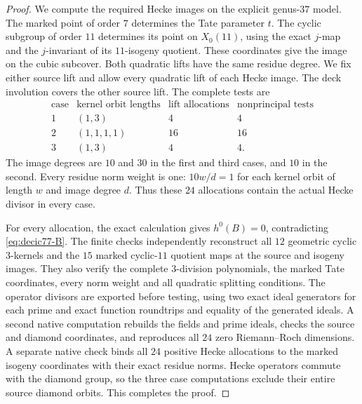 \begin{proof}
We compute the required Hecke images on the explicit genus-$37$
model.
The marked point of order $7$ determines the Tate parameter $t$.
The cyclic subgroup of order $11$ determines its point on
$X_0(11)$, using the exact $j$-map and the $j$-invariant of its
$11$-isogeny quotient.
These coordinates give the image on the cubic subcover.
Both quadratic lifts have the same residue degree.
We fix either source lift and allow every quadratic lift of each
Hecke image. The deck involution covers the other source lift.
The complete tests are
\[
\begin{array}{c|c|c|c}
\text{case}&\text{kernel orbit lengths}&\text{lift allocations}
 &\text{nonprincipal tests}\\\hline
1&(1,3)&4&4\\
2&(1,1,1,1)&16&16\\
3&(1,3)&4&4.
\end{array}
\]
The image degrees are $10$ and $30$ in the first and third
cases, and $10$ in the second.
Every residue norm weight is one: $10w/d=1$ for each kernel
orbit of length $w$ and image degree $d$.
Thus these $24$ allocations contain the actual Hecke divisor
in every case.

For every allocation, the exact calculation gives $h^0(B)=0$,
contradicting \eqref{eq:decic77-B}.
The finite checks independently reconstruct all $12$ geometric
cyclic $3$-kernels and the $15$ marked cyclic-$11$ quotient maps
at the source and isogeny images.
They also verify the complete $3$-division polynomials, the marked
Tate coordinates, every norm weight and all quadratic splitting
conditions.
The operator divisors are exported before testing, using two
exact ideal generators for each prime and exact function
roundtrips and equality of the generated ideals.
A second native computation rebuilds the fields and prime ideals,
checks the source and diamond coordinates, and reproduces all
$24$ zero Riemann--Roch dimensions.
A separate native check binds all $24$ positive Hecke allocations
to the marked isogeny coordinates with their exact residue norms.
Hecke operators commute with the diamond group, so the three
case computations exclude their entire source diamond orbits.
This completes the proof.
\end{proof}
